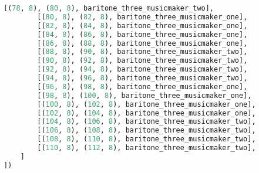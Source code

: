 \begin{lstlisting}[language=Python, caption=Invocation Source Code]
        [(78, 8), (80, 8), baritone_three_musicmaker_two],
        [(80, 8), (82, 8), baritone_three_musicmaker_one],
        [(82, 8), (84, 8), baritone_three_musicmaker_one],
        [(84, 8), (86, 8), baritone_three_musicmaker_one],
        [(86, 8), (88, 8), baritone_three_musicmaker_one],
        [(88, 8), (90, 8), baritone_three_musicmaker_two],
        [(90, 8), (92, 8), baritone_three_musicmaker_two],
        [(92, 8), (94, 8), baritone_three_musicmaker_two],
        [(94, 8), (96, 8), baritone_three_musicmaker_two],
        [(96, 8), (98, 8), baritone_three_musicmaker_one],
        [(98, 8), (100, 8), baritone_three_musicmaker_one],
        [(100, 8), (102, 8), baritone_three_musicmaker_one],
        [(102, 8), (104, 8), baritone_three_musicmaker_one],
        [(104, 8), (106, 8), baritone_three_musicmaker_two],
        [(106, 8), (108, 8), baritone_three_musicmaker_two],
        [(108, 8), (110, 8), baritone_three_musicmaker_two],
        [(110, 8), (112, 8), baritone_three_musicmaker_two],
    ]
])


\end{lstlisting}
